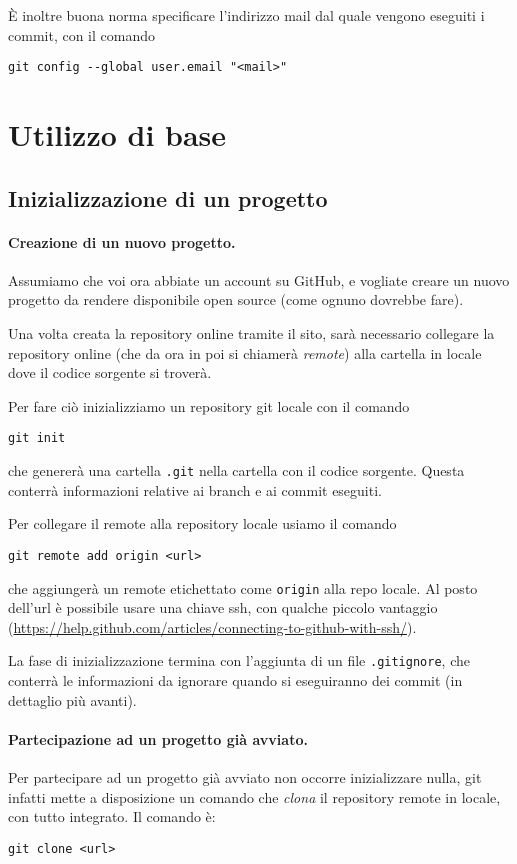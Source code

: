 \documentclass[a4paper, 11pt]{article}
\begin{document}
	È inoltre buona norma specificare l'indirizzo mail dal quale vengono eseguiti i commit, con il comando \begin{lstlisting}
git config --global user.email "<mail>"
	\end{lstlisting}
	
	\section{Utilizzo di base}
	\subsection{Inizializzazione di un progetto}
	\paragraph{Creazione di un nuovo progetto.}
	Assumiamo che voi ora abbiate un account su GitHub, e vogliate creare un nuovo progetto da rendere disponibile open source (come ognuno dovrebbe fare).
	
	Una volta creata la repository online tramite il sito, sarà necessario collegare la repository online (che da ora in poi si chiamerà \emph{remote}) alla cartella in locale dove il codice sorgente si troverà. 
	
	Per fare ciò inizializziamo un repository git locale con il comando \begin{lstlisting}
git init
	\end{lstlisting} che genererà una cartella \lstinline|.git| nella cartella con il codice sorgente. Questa conterrà informazioni relative ai branch e ai commit eseguiti.
	
	Per collegare il remote alla repository locale usiamo il comando \begin{lstlisting}
git remote add origin <url>
	\end{lstlisting}
	che aggiungerà un remote etichettato come \lstinline|origin| alla repo locale. Al posto dell'url è possibile usare una chiave ssh, con qualche piccolo vantaggio (\url{https://help.github.com/articles/connecting-to-github-with-ssh/}).
	
	La fase di inizializzazione termina con l'aggiunta di un file \lstinline|.gitignore|, che conterrà le informazioni da ignorare quando si eseguiranno dei commit (in dettaglio più avanti).
	
	\paragraph{Partecipazione ad un progetto già avviato.}
	Per partecipare ad un progetto già avviato non occorre inizializzare nulla, git infatti mette a disposizione un comando che \emph{clona} il repository remote in locale, con tutto integrato. Il comando è: \begin{lstlisting}
git clone <url>
	\end{lstlisting}
	
\end{document}
